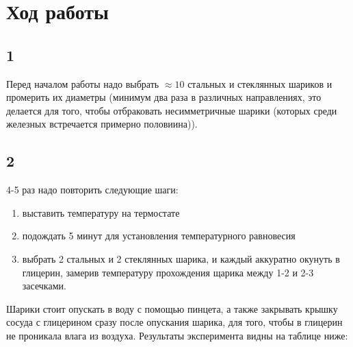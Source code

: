 \section*{Ход работы}
\subsection*{1}
Перед началом работы надо выбрать $\approx 10$ стальных и стеклянных шариков и промерить их диаметры (минимум два раза в различных направлениях, это делается для того, чтобы отбраковать несимметричные шарики (которых среди железных встречается примерно половиина)).
\subsection*{2}
4-5 раз надо повторить следующие шаги:
\begin{enumerate}
	\item выставить температуру на термостате
	\item подождать 5 минут для установления температурного равновесия
	\item выбрать 2 стальных и 2 стеклянных шарика, и каждый аккуратно окунуть в глицерин, замерив температуру прохождения щарика между 1-2 и 2-3 засечками.
\end{enumerate}
Шарики стоит опускать в воду с помощью пинцета, а также закрывать крышку сосуда с глицерином сразу после опускания шарика, для того, чтобы в глицерин не проникала влага из воздуха. Результаты эксперимента видны на таблице ниже:

